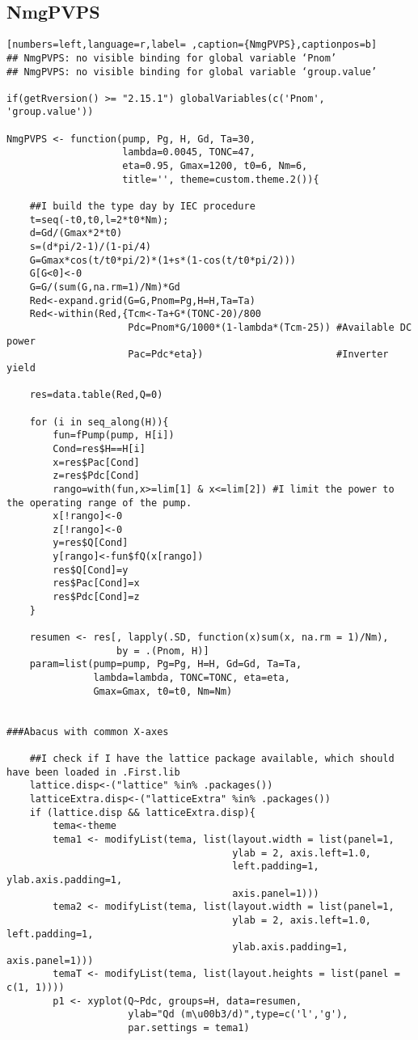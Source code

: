 \subsection{NmgPVPS}
\label{sec:org1b38ecb}
\begin{lstlisting}[numbers=left,language=r,label= ,caption={NmgPVPS},captionpos=b]
## NmgPVPS: no visible binding for global variable ‘Pnom’
## NmgPVPS: no visible binding for global variable ‘group.value’

if(getRversion() >= "2.15.1") globalVariables(c('Pnom', 'group.value'))

NmgPVPS <- function(pump, Pg, H, Gd, Ta=30,
                    lambda=0.0045, TONC=47,
                    eta=0.95, Gmax=1200, t0=6, Nm=6,
                    title='', theme=custom.theme.2()){

    ##I build the type day by IEC procedure
    t=seq(-t0,t0,l=2*t0*Nm);
    d=Gd/(Gmax*2*t0)
    s=(d*pi/2-1)/(1-pi/4)
    G=Gmax*cos(t/t0*pi/2)*(1+s*(1-cos(t/t0*pi/2)))
    G[G<0]<-0
    G=G/(sum(G,na.rm=1)/Nm)*Gd
    Red<-expand.grid(G=G,Pnom=Pg,H=H,Ta=Ta)
    Red<-within(Red,{Tcm<-Ta+G*(TONC-20)/800
                     Pdc=Pnom*G/1000*(1-lambda*(Tcm-25)) #Available DC power
                     Pac=Pdc*eta})                       #Inverter yield

    res=data.table(Red,Q=0)

    for (i in seq_along(H)){
        fun=fPump(pump, H[i])
        Cond=res$H==H[i]
        x=res$Pac[Cond]
        z=res$Pdc[Cond]
        rango=with(fun,x>=lim[1] & x<=lim[2]) #I limit the power to the operating range of the pump.
        x[!rango]<-0
        z[!rango]<-0
        y=res$Q[Cond]
        y[rango]<-fun$fQ(x[rango])
        res$Q[Cond]=y
        res$Pac[Cond]=x
        res$Pdc[Cond]=z
    }

    resumen <- res[, lapply(.SD, function(x)sum(x, na.rm = 1)/Nm),
                   by = .(Pnom, H)]
    param=list(pump=pump, Pg=Pg, H=H, Gd=Gd, Ta=Ta,
               lambda=lambda, TONC=TONC, eta=eta,
               Gmax=Gmax, t0=t0, Nm=Nm)


###Abacus with common X-axes

    ##I check if I have the lattice package available, which should have been loaded in .First.lib
    lattice.disp<-("lattice" %in% .packages())
    latticeExtra.disp<-("latticeExtra" %in% .packages())
    if (lattice.disp && latticeExtra.disp){
        tema<-theme
        tema1 <- modifyList(tema, list(layout.width = list(panel=1,
                                       ylab = 2, axis.left=1.0,
                                       left.padding=1, ylab.axis.padding=1,
                                       axis.panel=1)))
        tema2 <- modifyList(tema, list(layout.width = list(panel=1,
                                       ylab = 2, axis.left=1.0, left.padding=1,
                                       ylab.axis.padding=1, axis.panel=1)))
        temaT <- modifyList(tema, list(layout.heights = list(panel = c(1, 1))))
        p1 <- xyplot(Q~Pdc, groups=H, data=resumen,
                     ylab="Qd (m\u00b3/d)",type=c('l','g'),
                     par.settings = tema1)


\end{lstlisting}
